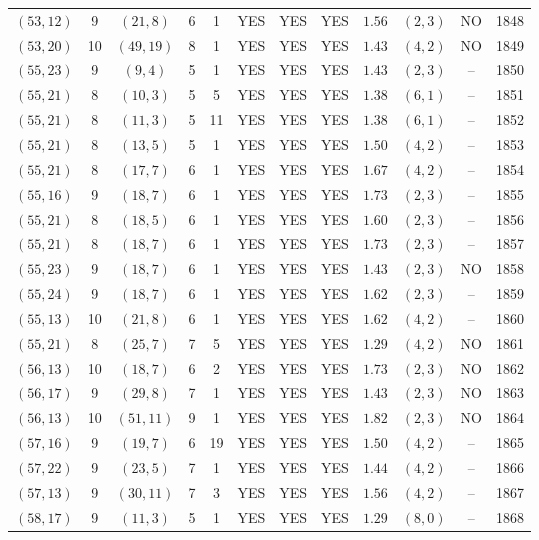 \begin{longtable}{|c|c|c|c|c|c|c|c|c|c|c|c|}
$(53,12)$ & 9 & $(21,8)$ & 6 & 1 & YES & YES & YES & $1.56$ & $(2,3)$ & NO & 1848\\
$(53,20)$ & 10 & $(49,19)$ & 8 & 1 & YES & YES & YES & $1.43$ & $(4,2)$ & NO & 1849\\
$(55,23)$ & 9 & $(9,4)$ & 5 & 1 & YES & YES & YES & $1.43$ & $(2,3)$ & -- & 1850\\
$(55,21)$ & 8 & $(10,3)$ & 5 & 5 & YES & YES & YES & $1.38$ & $(6,1)$ & -- & 1851\\
$(55,21)$ & 8 & $(11,3)$ & 5 & 11 & YES & YES & YES & $1.38$ & $(6,1)$ & -- & 1852\\
$(55,21)$ & 8 & $(13,5)$ & 5 & 1 & YES & YES & YES & $1.50$ & $(4,2)$ & -- & 1853\\
$(55,21)$ & 8 & $(17,7)$ & 6 & 1 & YES & YES & YES & $1.67$ & $(4,2)$ & -- & 1854\\
$(55,16)$ & 9 & $(18,7)$ & 6 & 1 & YES & YES & YES & $1.73$ & $(2,3)$ & -- & 1855\\
$(55,21)$ & 8 & $(18,5)$ & 6 & 1 & YES & YES & YES & $1.60$ & $(2,3)$ & -- & 1856\\
$(55,21)$ & 8 & $(18,7)$ & 6 & 1 & YES & YES & YES & $1.73$ & $(2,3)$ & -- & 1857\\
$(55,23)$ & 9 & $(18,7)$ & 6 & 1 & YES & YES & YES & $1.43$ & $(2,3)$ & NO & 1858\\
$(55,24)$ & 9 & $(18,7)$ & 6 & 1 & YES & YES & YES & $1.62$ & $(2,3)$ & -- & 1859\\
$(55,13)$ & 10 & $(21,8)$ & 6 & 1 & YES & YES & YES & $1.62$ & $(4,2)$ & -- & 1860\\
$(55,21)$ & 8 & $(25,7)$ & 7 & 5 & YES & YES & YES & $1.29$ & $(4,2)$ & NO & 1861\\
$(56,13)$ & 10 & $(18,7)$ & 6 & 2 & YES & YES & YES & $1.73$ & $(2,3)$ & NO & 1862\\
$(56,17)$ & 9 & $(29,8)$ & 7 & 1 & YES & YES & YES & $1.43$ & $(2,3)$ & NO & 1863\\
$(56,13)$ & 10 & $(51,11)$ & 9 & 1 & YES & YES & YES & $1.82$ & $(2,3)$ & NO & 1864\\
$(57,16)$ & 9 & $(19,7)$ & 6 & 19 & YES & YES & YES & $1.50$ & $(4,2)$ & -- & 1865\\
$(57,22)$ & 9 & $(23,5)$ & 7 & 1 & YES & YES & YES & $1.44$ & $(4,2)$ & -- & 1866\\
$(57,13)$ & 9 & $(30,11)$ & 7 & 3 & YES & YES & YES & $1.56$ & $(4,2)$ & -- & 1867\\
$(58,17)$ & 9 & $(11,3)$ & 5 & 1 & YES & YES & YES & $1.29$ & $(8,0)$ & -- & 1868\\

\end{longtable}
